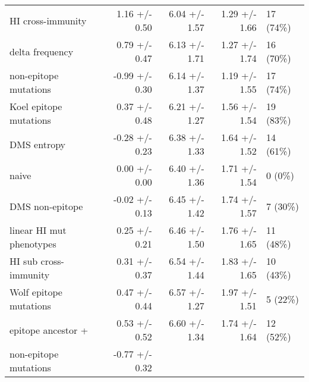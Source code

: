 \begin{tabular*}{1.0\textwidth}{lrrrl}
                 HI cross-immunity &   1.16 +/- 0.50 &                          6.04 +/- 1.57 &                                   1.29 +/- 1.66 &                               17 (74\%) \\
                   delta frequency &   0.79 +/- 0.47 &                          6.13 +/- 1.71 &                                   1.27 +/- 1.74 &                               16 (70\%) \\
             non-epitope mutations &  -0.99 +/- 0.30 &                          6.14 +/- 1.37 &                                   1.19 +/- 1.55 &                               17 (74\%) \\
            Koel epitope mutations &   0.37 +/- 0.48 &                          6.21 +/- 1.27 &                                   1.56 +/- 1.54 &                               19 (83\%) \\
                       DMS entropy &  -0.28 +/- 0.23 &                          6.38 +/- 1.33 &                                   1.64 +/- 1.52 &                               14 (61\%) \\
                             naive &   0.00 +/- 0.00 &                          6.40 +/- 1.36 &                                   1.71 +/- 1.54 &                                 0 (0\%) \\
                   DMS non-epitope &  -0.02 +/- 0.13 &                          6.45 +/- 1.42 &                                   1.74 +/- 1.57 &                                7 (30\%) \\
          linear HI mut phenotypes &   0.25 +/- 0.21 &                          6.46 +/- 1.50 &                                   1.76 +/- 1.65 &                               11 (48\%) \\
             HI sub cross-immunity &   0.31 +/- 0.37 &                          6.54 +/- 1.44 &                                   1.83 +/- 1.65 &                               10 (43\%) \\
            Wolf epitope mutations &   0.47 +/- 0.44 &                          6.57 +/- 1.27 &                                   1.97 +/- 1.51 &                                5 (22\%) \\
                epitope ancestor + &   0.53 +/- 0.52 &                          6.60 +/- 1.34 &                                   1.74 +/- 1.64 &                               12 (52\%) \\
 \hspace{3mm}non-epitope mutations &  -0.77 +/- 0.32 &                                        &                                                 &                                         \\

\end{tabular*}
